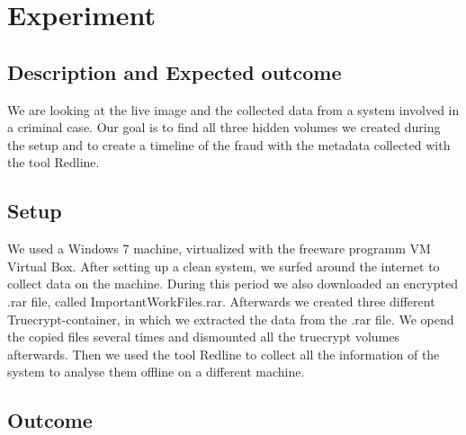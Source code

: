 \section{Experiment}
\subsection{Description and Expected outcome}
We are looking at the live image and the collected data from a system involved in a criminal case. Our goal is to find
all three hidden volumes we created during the setup and to create a timeline of the fraud with the metadata collected with
the tool Redline.

\subsection{Setup}
We used a Windows 7 machine, virtualized with the freeware programm VM Virtual Box. After setting up a clean system, we 
surfed around the internet to collect data on the machine. During this period we also downloaded an encrypted
.rar file, called ImportantWorkFiles.rar. Afterwards we created three different Truecrypt-container, in which we extracted
the data from the .rar file. We opend the copied files several times and dismounted all the truecrypt volumes afterwards.
Then we used the tool Redline to collect all the information of the system to analyse them offline on a different
machine.

\subsection{Outcome}

